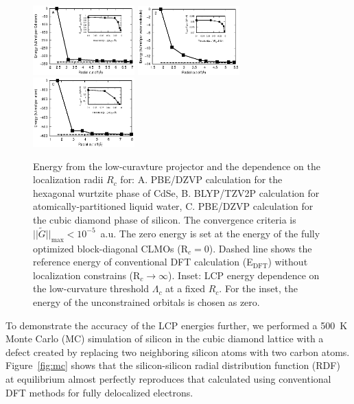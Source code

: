 \documentclass[aps,prl,twocolumn,reprint,amsmath,amssymb]{revtex4-1}
\begin{document}
\begin{figure}
\centering
\includegraphics[width=0.35\textwidth]{CdSe_conv}
\includegraphics[width=0.35\textwidth]{H2O_conv}
\includegraphics[width=0.35\textwidth]{Si_conv}
\caption{Energy from the low-curavture projector and the dependence on the localization radii $R_c$ for: A. PBE/DZVP calculation for the hexagonal wurtzite phase of CdSe, B. BLYP/TZV2P calculation for atomically-partitioned liquid water, C. PBE/DZVP calculation for the cubic diamond phase of silicon. The convergence criteria is $\vert\vert \tilde{G} \vert\vert_{\text{max}} < 10^{-5}$~a.u. The zero energy is set at the energy of the fully optimized block-diagonal CLMOs (R$_c = 0$). Dashed line shows the reference energy of conventional DFT calculation (E$_{\text{DFT}}$) without localization constrains (R$_c\rightarrow \infty$). 
Inset: LCP energy dependence on the low-curvature threshold $\Lambda_c$ at a fixed $R_c$. For the inset, the energy of the unconstrained orbitals is chosen as zero.}
\label{fig:accuracy}
\end{figure}

To demonstrate the accuracy of the LCP energies further, we performed a 500~K Monte Carlo (MC) simulation of silicon in the cubic diamond lattice with a defect created by replacing two neighboring silicon atoms with two carbon atoms. Figure~\ref{fig:mc} shows that the silicon-silicon radial distribution function (RDF) at equilibrium almost perfectly reproduces that calculated using conventional DFT methods for fully delocalized electrons. 
\end{document}
